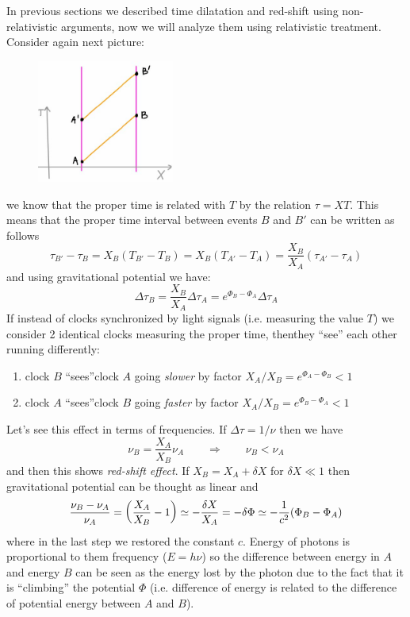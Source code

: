 \documentclass[../main/main.tex]{subfiles}
\begin{document}
In previous sections we described time dilatation and red-shift using non-relativistic arguments, now we will analyze them using relativistic treatment.
Consider again next picture:
\begin{figure}[H]
\centering
\includegraphics[width=4.5cm]{../img/T-meaning-Rindler.jpg}
\end{figure}
\noindent we know that the proper time is related with $T$ by the relation $\tau=XT$. This means that the proper time interval between events $B$ and $B'$ can be written as follows
\[\tau_{B'}-\tau_B=X_B(T_{B'}-T_B)=X_B(T_{A'}-T_A)=\frac{X_B}{X_A}(\tau_{A'}-\tau_A)\]
and using gravitational potential we have:
\[\boxed{
\Delta\tau_B=\frac{X_B}{X_A}\Delta\tau_A=e^{\Phi_B-\Phi_A}\Delta\tau_A
}\]
If instead of clocks synchronized by light signals (i.e. measuring the value $T$) we consider 2 identical clocks measuring the proper time, thenthey ``see'' each other running differently:
\begin{enumerate}[label=\textbullet]
\item clock $B$ ``sees''clock $A$ going \emph{slower} by factor $X_A/X_B=e^{\Phi_A-\Phi_B}<1$
\item clock $A$ ``sees''clock $B$ going \emph{faster} by factor $X_A/X_B=e^{\Phi_B-\Phi_A}<1$
\end{enumerate}
Let's see this effect in terms of frequencies. If $\Delta\tau=1/\nu$ then we have
\[\nu_B=\frac{X_A}{X_B}\nu_A\qquad\Rightarrow\qquad\nu_B<\nu_A\]
and then this shows \emph{red-shift effect}. If $X_B=X_A+\delta X$ for $\delta X\ll1$ then gravitational potential can be thought as linear and
\[\frac{\nu_B-\nu_A}{\nu_A}=\left(\frac{X_A}{X_B}-1\right)\simeq-\frac{\delta X}{X_A}=-\delta\Phi\simeq-\frac{1}{c^2}(\Phi_B-\Phi_A)\]
where in the last step we restored the constant $c$.
Energy of photons is proportional to them frequency ($E=h\nu$) so the difference between energy in $A$ and energy $B$ can be seen as the energy lost by the photon due to the fact that it is ``climbing'' the potential $\Phi$ (i.e. difference of energy is related to the difference of potential energy between $A$ and $B$).
\end{document}
